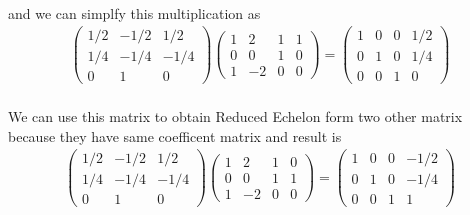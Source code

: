\documentclass[11pt]{article}
\begin{document}
\paragraph{}and we can simplfy this multiplication as
\begin{eqnarray}
\begin{pmatrix}
	1/2 & -1/2 & 1/2\\
	1/4 & -1/4 & -1/4\\
	0 & 1 & 0
\end{pmatrix}
\left(\begin{array}{ccc|c}  
	1 & 2 & 1 & 1 \\
    0 & 0 & 1 & 0 \\
    1 & -2 & 0 & 0
\end{array}\right)
=
\left(\begin{array}{ccc|c}  
	1 & 0 & 0 & 1/2 \\
    0 & 1 & 0 & 1/4 \\
    0 & 0 & 1 & 0
\end{array}\right)
\end{eqnarray}
\paragraph{}We can use this matrix to obtain Reduced Echelon form two other matrix because they have same coefficent matrix and result is
\begin{eqnarray}
\begin{pmatrix}
	1/2 & -1/2 & 1/2\\
	1/4 & -1/4 & -1/4\\
	0 & 1 & 0
\end{pmatrix}
\left(\begin{array}{ccc|c}  
	1 & 2 & 1 & 0 \\
    0 & 0 & 1 & 1 \\
    1 & -2 & 0 & 0
\end{array}\right)
=
\left(\begin{array}{ccc|c}  
	1 & 0 & 0 & -1/2 \\
    0 & 1 & 0 & -1/4 \\
    0 & 0 & 1 & 1
\end{array}\right)
\end{eqnarray}
\end{document}
